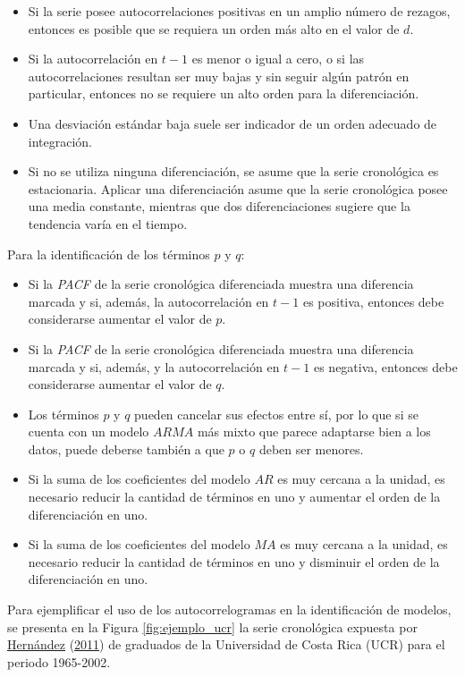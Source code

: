 \documentclass[
]{article}
\providecommand{\tightlist}{%
  \setlength{\itemsep}{0pt}\setlength{\parskip}{0pt}}
\begin{document}
\begin{itemize}
\tightlist
\item
  Si la serie posee autocorrelaciones positivas en un amplio número de
  rezagos, entonces es posible que se requiera un orden más alto en el
  valor de \(d\).
\item
  Si la autocorrelación en \(t-1\) es menor o igual a cero, o si las
  autocorrelaciones resultan ser muy bajas y sin seguir algún patrón en
  particular, entonces no se requiere un alto orden para la
  diferenciación.
\item
  Una desviación estándar baja suele ser indicador de un orden adecuado
  de integración.
\item
  Si no se utiliza ninguna diferenciación, se asume que la serie
  cronológica es estacionaria. Aplicar una diferenciación asume que la
  serie cronológica posee una media constante, mientras que dos
  diferenciaciones sugiere que la tendencia varía en el tiempo.
\end{itemize}

Para la identificación de los términos \(p\) y \(q\):

\begin{itemize}
\tightlist
\item
  Si la \emph{PACF} de la serie cronológica diferenciada muestra una
  diferencia marcada y si, además, la autocorrelación en \(t-1\) es
  positiva, entonces debe considerarse aumentar el valor de \(p\).
\item
  Si la \emph{PACF} de la serie cronológica diferenciada muestra una
  diferencia marcada y si, además, y la autocorrelación en \(t-1\) es
  negativa, entonces debe considerarse aumentar el valor de \(q\).
\item
  Los términos \(p\) y \(q\) pueden cancelar sus efectos entre sí, por
  lo que si se cuenta con un modelo \(ARMA\) más mixto que parece
  adaptarse bien a los datos, puede deberse también a que \(p\) o \(q\)
  deben ser menores.
\item
  Si la suma de los coeficientes del modelo \(AR\) es muy cercana a la
  unidad, es necesario reducir la cantidad de términos en uno y aumentar
  el orden de la diferenciación en uno.
\item
  Si la suma de los coeficientes del modelo \(MA\) es muy cercana a la
  unidad, es necesario reducir la cantidad de términos en uno y
  disminuir el orden de la diferenciación en uno.
\end{itemize}

Para ejemplificar el uso de los autocorrelogramas en la identificación
de modelos, se presenta en la Figura \ref{fig:ejemplo_ucr} la serie
cronológica expuesta por \protect\hyperlink{ref-oscarh-1}{Hernández}
(\protect\hyperlink{ref-oscarh-1}{2011}) de graduados de la Universidad
de Costa Rica (UCR) para el periodo 1965-2002.
\end{document}
